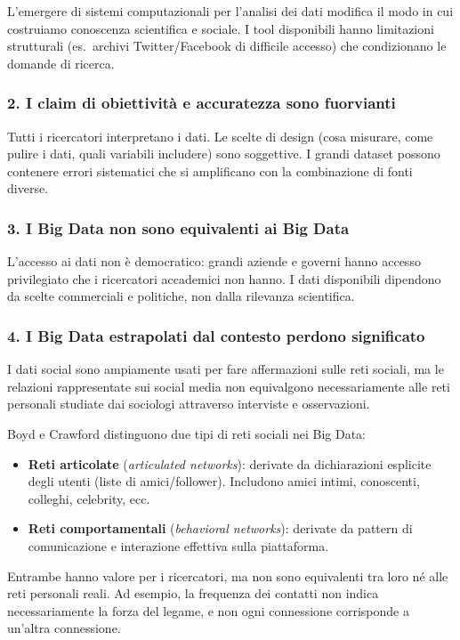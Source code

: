 \documentclass[12pt,a4paper]{article}
\begin{document}
L'emergere di sistemi computazionali per l'analisi dei dati modifica il modo in cui
costruiamo conoscenza scientifica e sociale. I tool disponibili hanno limitazioni
strutturali (es.\ archivi Twitter/Facebook di difficile accesso) che condizionano
le domande di ricerca.

\subsubsection{2. I claim di obiettività e accuratezza sono fuorvianti}

Tutti i ricercatori interpretano i dati. Le scelte di design (cosa misurare, come pulire
i dati, quali variabili includere) sono soggettive. I grandi dataset possono contenere
errori sistematici che si amplificano con la combinazione di fonti diverse.

\subsubsection{3. I Big Data non sono equivalenti ai Big Data}

L'accesso ai dati non è democratico: grandi aziende e governi hanno accesso privilegiato
che i ricercatori accademici non hanno. I dati disponibili dipendono da scelte commerciali
e politiche, non dalla rilevanza scientifica.

\subsubsection{4. I Big Data estrapolati dal contesto perdono significato}

I dati social sono ampiamente usati per fare affermazioni sulle reti sociali, ma le relazioni
rappresentate sui social media non equivalgono necessariamente alle reti personali studiate
dai sociologi attraverso interviste e osservazioni.

Boyd e Crawford distinguono due tipi di reti sociali nei Big Data:
\begin{itemize}
  \item \textbf{Reti articolate} (\textit{articulated networks}): derivate da dichiarazioni
        esplicite degli utenti (liste di amici/follower). Includono amici intimi, conoscenti,
        colleghi, celebrity, ecc.
  \item \textbf{Reti comportamentali} (\textit{behavioral networks}): derivate da pattern
        di comunicazione e interazione effettiva sulla piattaforma.
\end{itemize}
Entrambe hanno valore per i ricercatori, ma non sono equivalenti tra loro né alle reti
personali reali. Ad esempio, la frequenza dei contatti non indica necessariamente la forza
del legame, e non ogni connessione corrisponde a un'altra connessione.
\end{document}
